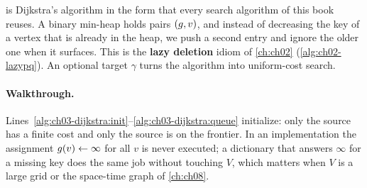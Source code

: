  is Dijkstra's algorithm in the form that every search algorithm of this
book reuses. A binary min-heap holds pairs $(g,v)$, and instead of decreasing the key of a
vertex that is already in the heap, we push a second entry and ignore the older one when it
surfaces. This is the \textbf{lazy deletion} idiom of \cref{ch:ch02} (\cref{alg:ch02-lazypq}). An optional target $\gamma$ turns the algorithm into uniform-cost
search.

\begin{algorithm}[htb]
\caption{Dijkstra's algorithm with a binary heap and lazy deletion. Without a target it computes
$\dist(s,v)$ for every vertex; with a target $\gamma$ it stops as soon as $\gamma$ is settled
(uniform-cost search).}
\label{alg:ch03-dijkstra}
\end{algorithm}

\paragraph{Walkthrough.} Lines~\ref{alg:ch03-dijkstra:init}--\ref{alg:ch03-dijkstra:queue}
initialize: only the source has a finite cost and only the source is on the frontier. In an
implementation the assignment $g(v)\gets\infty$ for all $v$ is never executed; a dictionary
that answers $\infty$ for a missing key does the same job without touching $V$, which matters
when $V$ is a large grid or the space-time graph of \cref{ch:ch08}.

